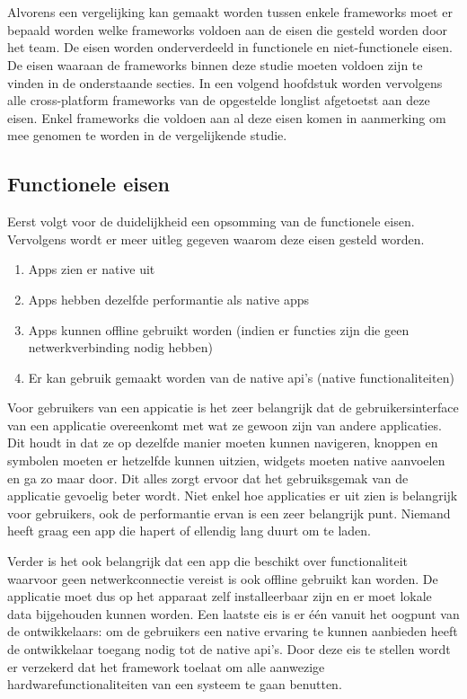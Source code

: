 \chapter{}
\label{ch:eisen-framework}

Alvorens een vergelijking kan gemaakt worden tussen enkele frameworks moet er bepaald worden welke frameworks voldoen aan de eisen die gesteld worden door het team. De eisen worden onderverdeeld in functionele en niet-functionele eisen. De eisen waaraan de frameworks binnen deze studie moeten voldoen zijn te vinden in de onderstaande secties. In een volgend hoofdstuk worden vervolgens alle cross-platform frameworks van de opgestelde longlist afgetoetst aan deze eisen. Enkel frameworks die voldoen aan al deze eisen komen in aanmerking om mee genomen te worden in de vergelijkende studie.

\section{Functionele eisen}

Eerst volgt voor de duidelijkheid een opsomming van de functionele eisen. Vervolgens wordt er meer uitleg gegeven waarom deze eisen gesteld worden.
\begin{enumerate}
    \item Apps zien er native uit
    \item Apps hebben dezelfde performantie als native apps
    \item Apps kunnen offline gebruikt worden (indien er functies zijn die geen netwerkverbinding nodig hebben)
    \item Er kan gebruik gemaakt worden van de native api's (native functionaliteiten)
\end{enumerate}

Voor gebruikers van een appicatie is het zeer belangrijk dat de gebruikersinterface van een applicatie overeenkomt met wat ze gewoon zijn van andere applicaties. Dit houdt in dat ze op dezelfde manier moeten kunnen navigeren, knoppen en symbolen moeten er hetzelfde kunnen uitzien, widgets moeten native aanvoelen en ga zo maar door. Dit alles zorgt ervoor dat het gebruiksgemak van de applicatie gevoelig beter wordt. Niet enkel hoe applicaties er uit zien is belangrijk voor gebruikers, ook de performantie ervan is een zeer belangrijk punt. Niemand heeft graag een app die hapert of ellendig lang duurt om te laden. 

Verder is het ook belangrijk dat een app die beschikt over functionaliteit waarvoor geen netwerkconnectie vereist is ook offline gebruikt kan worden. De applicatie moet dus op het apparaat zelf installeerbaar zijn en er moet lokale data bijgehouden kunnen worden. Een laatste eis is er één vanuit het oogpunt van de ontwikkelaars: om de gebruikers een native ervaring te kunnen aanbieden heeft de ontwikkelaar toegang nodig tot de native api's. Door deze eis te stellen wordt er verzekerd dat het framework toelaat om alle aanwezige hardwarefunctionaliteiten van een systeem te gaan benutten.


